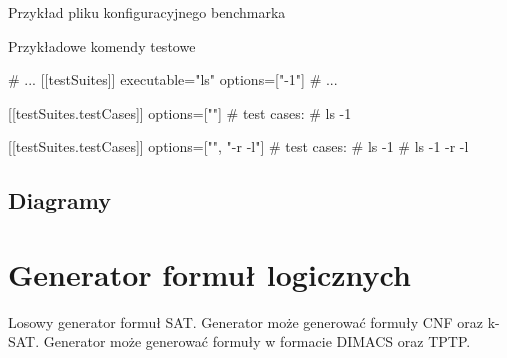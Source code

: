 \documentclass[a4paper,12pt]{article}
\newenvironment{longlisting}{\captionsetup{type=listing}}{}
\begin{document}
\begin{longlisting}
  \caption{Przykład pliku konfiguracyjnego benchmarka}
  \label{configFile}
\end{longlisting}


\begin{longlisting}
  \caption{Przykładowe komendy testowe}
  \begin{tomlcode}
# ...
[[testSuites]]
executable="ls"
options=["-1"]
# ...

[[testSuites.testCases]]
options=[""]
# test cases:
# ls -1

[[testSuites.testCases]]
options=["", "-r -l"]
# test cases:
# ls -1
# ls -1 -r -l
  \end{tomlcode}
\end{longlisting}
[/TO VERIFY]

\subsection{Diagramy}
%
%
%
%
%

\section{Generator formuł logicznych} \label{LFG}

Losowy generator formuł SAT. Generator może generować formuły \gls{CNF} oraz \gls{k-SAT}. Generator może generować formuły w formacie DIMACS oraz TPTP.
\end{document}
